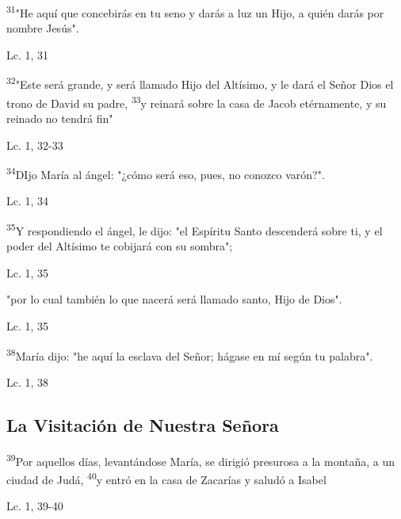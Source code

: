 \documentclass[a4paper,11pt,sans]{article}
\begin{document}
      \textsuperscript{31}"He aquí que concebirás en tu seno y darás a luz un Hijo, a quién darás por nombre Jesús".

      \begin{center}
        Lc. 1, 31      
      \end{center}

      \textsuperscript{32}"Este será grande, y será llamado Hijo del Altísimo, y le dará el Señor Dios el trono de David su padre, \textsuperscript{33}y reinará
      sobre la casa de Jacob etérnamente, y su reinado no tendrá fin"

      \begin{center}
        Lc. 1, 32-33        
      \end{center}
      
      \textsuperscript{34}DIjo María al ángel: "¿cómo será eso, pues, no conozco varón?".

      \begin{center}
        Lc. 1, 34         
      \end{center}
      
      \textsuperscript{35}Y respondiendo el ángel, le dijo: "el Espíritu Santo descenderá sobre ti, y el poder del Altísimo te cobijará con su sombra";

      \begin{center}
        Lc. 1, 35       
      \end{center}
      
      "por lo cual también lo que nacerá será llamado santo, Hijo de Dios".

      \begin{center}
        Lc. 1, 35      
      \end{center}      
      
      \textsuperscript{38}María dijo: "he aquí la esclava del Señor; hágase en mí según tu palabra".

      \begin{center}
        Lc. 1, 38      
      \end{center}
            
    \subsection*{\hfil La Visitación de Nuestra Señora \hfil}
      
      \textsuperscript{39}Por aquellos días, levantándose María, se dirigió presurosa a la montaña, a un ciudad de Judá, \textsuperscript{40}y entró en la casa
      de Zacarías y saludó a Isabel
      \begin{center}
        Lc. 1, 39-40        
      \end{center}
      
\end{document}
